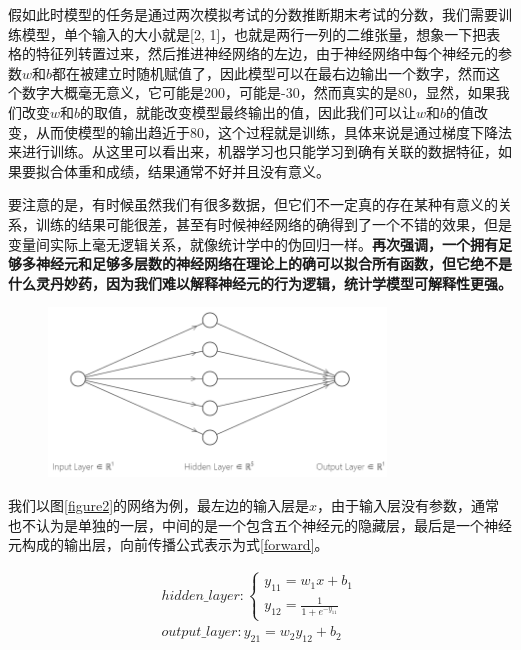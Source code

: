 \documentclass[a5paper, 11pt]{ctexbook}
\begin{document}
假如此时模型的任务是通过两次模拟考试的分数推断期末考试的分数，我们需要训练模型，单个输入的大小就是[2, 1]，也就是两行一列的二维张量，想象一下把表格的特征列转置过来，然后推进神经网络的左边，由于神经网络中每个神经元的参数$w$和$b$都在被建立时随机赋值了，因此模型可以在最右边输出一个数字，然而这个数字大概毫无意义，它可能是200，可能是-30，然而真实的是80，显然，如果我们改变$w$和$b$的取值，就能改变模型最终输出的值，因此我们可以让$w$和$b$的值改变，从而使模型的输出趋近于80，这个过程就是训练，具体来说是通过梯度下降法来进行训练。从这里可以看出来，机器学习也只能学习到确有关联的数据特征，如果要拟合体重和成绩，结果通常不好并且没有意义。

要注意的是，有时候虽然我们有很多数据，但它们不一定真的存在某种有意义的关系，训练的结果可能很差，甚至有时候神经网络的确得到了一个不错的效果，但是变量间实际上毫无逻辑关系，就像统计学中的伪回归一样。\textbf{再次强调，一个拥有足够多神经元和足够多层数的神经网络在理论上的确可以拟合所有函数，但它绝不是什么灵丹妙药，因为我们难以解释神经元的行为逻辑，统计学模型可解释性更强。}

\begin{figure}[ht]
    \centering
    \includegraphics[width=0.8\textwidth]{figures/神经网络.png}
\end{figure}

我们以图\ref{figure2}的网络为例，最左边的输入层是$x$，由于输入层没有参数，通常也不认为是单独的一层，中间的是一个包含五个神经元的隐藏层，最后是一个神经元构成的输出层，向前传播公式表示为式\ref{forward}。

\begin{equation}\label{forward}
    \begin{aligned}
        hidden\_layer:
        \begin{cases}
            y_{11} = w_1x+b_1 \\
            y_{12} = \frac{1}{1+e^{-y_{11}}}
        \end{cases} \\
        output\_layer:
        y_{21} = w_2y_{12} + b_2
    \end{aligned}
\end{equation}
\end{document}
